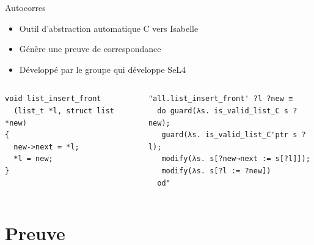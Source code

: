 \documentclass[hyperref={pdfpagelabels=false}]{beamer}
\begin{document}

\begin{frame}[fragile]{Autocorres}
    \begin{itemize}
      \item Outil d'abstraction automatique C vers Isabelle
      \item Génère une preuve de correspondance
      \item Développé par le groupe qui développe SeL4
    \end{itemize}
  \begin{columns}[T] %
    \begin{column}{.40\textwidth}
      \begin{verbatim}
void list_insert_front
  (list_t *l, struct list *new)
{
  new->next = *l;
  *l = new;
} 
      \end{verbatim}
    \end{column}
    \begin{column}{.62\textwidth}
      \begin{lstlisting}
"all.list_insert_front' ?l ?new ≡
  do guard(λs. is_valid_list_C s ?new);
   guard(λs. is_valid_list_C'ptr s ?l);
   modify(λs. s[?new→next := s[?l]]);
   modify(λs. s[?l := ?new])
  od"
      \end{lstlisting}
    \end{column}
  \end{columns}

\end{frame}


\section{Preuve}
\end{document}
